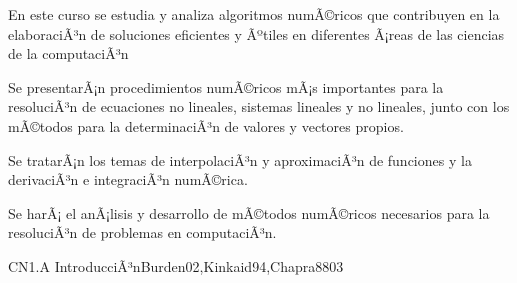 
\begin{syllabus}


\begin{justification}
En este curso se estudia y analiza algoritmos numÃ©ricos que
contribuyen en la elaboraciÃ³n de soluciones eficientes y Ãºtiles en
diferentes Ã¡reas de las ciencias de la computaciÃ³n
\end{justification}

\begin{goals}
\item Se presentarÃ¡n procedimientos numÃ©ricos mÃ¡s importantes para la resoluciÃ³n de 
ecuaciones no lineales, sistemas lineales y no lineales, junto con los mÃ©todos 
para la determinaciÃ³n de valores y vectores propios.

\item Se tratarÃ¡n los temas de interpolaciÃ³n y aproximaciÃ³n de funciones y la 
derivaciÃ³n e integraciÃ³n numÃ©rica.

\item Se harÃ¡ el anÃ¡lisis y desarrollo de mÃ©todos numÃ©ricos necesarios para la 
resoluciÃ³n de problemas en computaciÃ³n.
\end{goals}

\begin{outcomes}
\end{outcomes}

\begin{unit}{CN1.A IntroducciÃ³n}{Burden02,Kinkaid94,Chapra88}{0}{3}
\begin{topics}
      \item \CNONETopicFloating
      \item \CNONETopicError
      \item \CNONETopicTaylor
   \end{topics}

   \begin{learningoutcomes}
      \item \CNONEObjONE
      \item \CNONEObjTWO
      \item \CNONEObjTHREE
      \item \CNONEObjFOUR
   \end{learningoutcomes}
\end{unit}


\end{syllabus}
